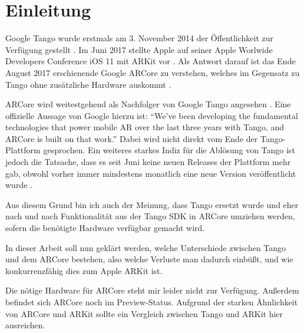 
\section{Einleitung}

Google Tango wurde erstmals am 3. November 2014 der Öffentlichkeit zur Verfügung gestellt \cite{tango_release_notes}. Im Juni 2017 stellte Apple auf seiner Apple Worlwide Developers Conference iOS 11 mit ARKit vor \cite{ios11_announcement}. Als Antwort darauf ist das Ende August 2017 erschienende Google ARCore zu verstehen, welches im Gegensatz zu Tango ohne zusätzliche Hardware auskommt \cite{arcore_announcement}.

ARCore wird weitestgehend als Nachfolger von Google Tango angesehen \cite{cnet_arcore}\cite{heise_arcore}. Eine offizielle Aussage von Google hierzu ist: "`We’ve been developing the fundamental technologies that power mobile AR over the last three years with Tango, and ARCore is built on that work."'\cite{arcore_announcement} Dabei wird nicht direkt vom Ende der Tango-Plattform gesprochen. Ein weiteres starkes Indiz für die Ablösung von Tango ist jedoch die Tatsache, dass es seit Juni keine neuen Releases der Plattform mehr gab, obwohl vorher immer mindestens monatlich eine neue Version veröffentlicht wurde \cite{tango_release_notes}.

Aus diesem Grund bin ich auch der Meinung, dass Tango ersetzt wurde und eher nach und nach Funktionalität aus der Tango SDK in ARCore umziehen werden, sofern die benötigte Hardware verfügbar gemacht wird.

In dieser Arbeit soll nun geklärt werden, welche Unterschiede zwischen Tango und dem ARCore bestehen, also welche Verluste man dadurch einbüßt, und wie konkurrenzfähig dies zum Apple ARKit ist.

Die nötige Hardware für ARCore steht mir leider nicht zur Verfügung. Außerdem befindet sich ARCore noch im Preview-Status. Aufgrund der starken Ähnlichkeit von ARCore und ARKit sollte ein Vergleich zwischen Tango und ARKit hier ausreichen.
